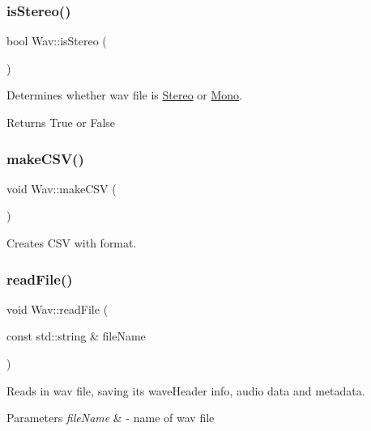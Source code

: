 \subsubsection{\texorpdfstring{is\+Stereo()}{isStereo()}}
{\footnotesize\ttfamily bool Wav\+::is\+Stereo (\begin{DoxyParamCaption}{ }\end{DoxyParamCaption})}

Determines whether wav file is \hyperlink{classStereo}{Stereo} or \hyperlink{classMono}{Mono}. \begin{DoxyReturn}{Returns}
True or False 
\end{DoxyReturn}
\mbox{\label{classWav_ab2edefac96cd80a22875705ad2533e91}} 
\subsubsection{\texorpdfstring{make\+C\+S\+V()}{makeCSV()}}
{\footnotesize\ttfamily void Wav\+::make\+C\+SV (\begin{DoxyParamCaption}{ }\end{DoxyParamCaption})\hspace{0.3cm}{\ttfamily [static]}}

Creates C\+SV with format. \mbox{\label{classWav_a1c4230cec49d30147a5b8a1950083f7c}} 
\subsubsection{\texorpdfstring{read\+File()}{readFile()}}
{\footnotesize\ttfamily void Wav\+::read\+File (\begin{DoxyParamCaption}\item[{const std\+::string \&}]{file\+Name }\end{DoxyParamCaption})}

Reads in wav file, saving it\textquotesingle{}s wave\+Header info, audio data and metadata.


\begin{DoxyParams}{Parameters}
{\em file\+Name} & -\/ name of wav file \\
\hline
\end{DoxyParams}
\mbox{\label{classWav_a7bae34f37288c53cb113e76045f78098}} 
